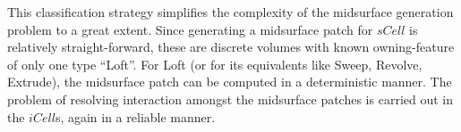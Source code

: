 This classification strategy simplifies the complexity of the midsurface generation problem to a great extent. Since generating a midsurface patch for $sCell$  is relatively straight-forward, these are discrete volumes with known owning-feature of only one type ``Loft''. For Loft (or for its equivalents like Sweep, Revolve, Extrude), the midsurface patch can be computed in a deterministic manner. The problem of resolving interaction amongst the midsurface patches is carried out in the $iCell$s, again in a reliable manner.
%
%

%
%
				
